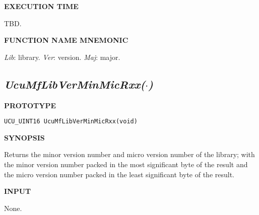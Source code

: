 \noindent\textbf{EXECUTION TIME}
\begin{list}{}{\setlength{\leftmargin}{0.25in}\setlength{\topsep}{0.0in}}
\item TBD.
\end{list}
\vspace{2.8ex}

\noindent\textbf{FUNCTION NAME MNEMONIC}
\begin{list}{}{\setlength{\leftmargin}{0.25in}\setlength{\topsep}{0.0in}}
\item \emph{Lib}: library.  \emph{Ver}: version.  \emph{Maj}: major.
\end{list}


\subsection[\emph{UcuMfLibVerMinMicRxx(\protect\mbox{\protect$\cdot$})}]
           {\emph{UcuMfLibVerMinMicRxx(\protect\mbox{\protect\boldmath $\cdot$})}}
\label{cmsc0:slvm0}

%

\noindent\textbf{PROTOTYPE}
\begin {list}{}{\setlength{\leftmargin}{0.25in}\setlength{\topsep}{0.0in}}
\item
\begin{verbatim}
UCU_UINT16 UcuMfLibVerMinMicRxx(void)
\end{verbatim}
\end{list}
\vspace{2.8ex}

\noindent\textbf{SYNOPSIS}
\begin{list}{}{\setlength{\leftmargin}{0.25in}\setlength{\topsep}{0.0in}}
\item
Returns the minor version number and micro version number of the library;
with the minor version number packed in the most significant byte of the
result and the micro version number packed in the least significant byte
of the result.
\end{list}
\vspace{2.8ex}

\noindent\textbf{INPUT}
\begin{list}{}{\setlength{\leftmargin}{0.5in}\setlength{\itemindent}{-0.25in}\setlength{\topsep}{0.0in}\setlength{\partopsep}{0.0in}}
\item None.
\end{list}
\vspace{2.8ex}

